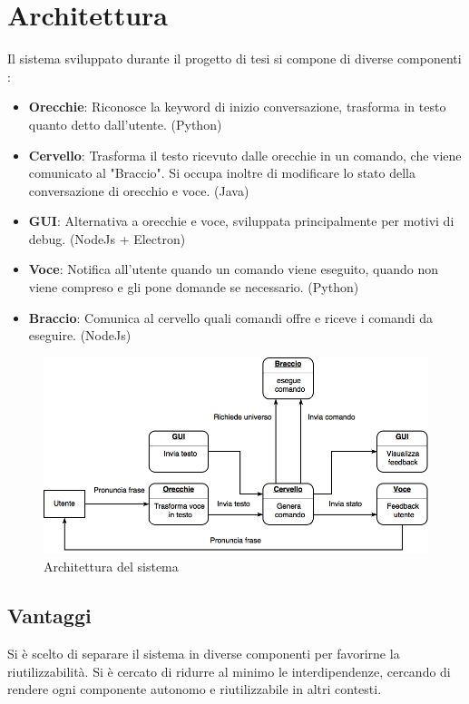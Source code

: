\documentclass[twoside]{supsistudent}
\begin{document}
\chapter{Architettura}

Il sistema sviluppato durante il progetto di tesi si compone di diverse componenti :
\begin{itemize}
	\item \textbf{Orecchie}: Riconosce la keyword di inizio conversazione, trasforma in testo quanto detto dall'utente. (Python)
	\item \textbf{Cervello}: Trasforma il testo ricevuto dalle orecchie in un comando, che viene comunicato al "Braccio". Si occupa inoltre di modificare lo stato della conversazione di orecchio e voce. (Java)
	\item \textbf{GUI}: Alternativa a orecchie e voce, sviluppata principalmente per motivi di debug. (NodeJs + Electron)
	\item \textbf{Voce}: Notifica all'utente quando un comando viene eseguito, quando non viene compreso e gli pone domande se necessario. (Python)
	\item \textbf{Braccio}: Comunica al cervello quali comandi offre e riceve i comandi da eseguire. (NodeJs)
\end{itemize}
\begin{figure}[H]
\centering
\includegraphics[width=\textwidth]{Architettura}
\caption{Architettura del sistema}
\label{fig:pose}
\end{figure}
\section{Vantaggi}
Si è scelto di separare il sistema in diverse componenti per favorirne la riutilizzabilità. Si è cercato di ridurre al minimo le interdipendenze, cercando di rendere ogni componente autonomo e riutilizzabile in altri contesti.
\end{document}
